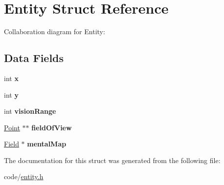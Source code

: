 \hypertarget{structEntity}{}\section{Entity Struct Reference}
\label{structEntity}


Collaboration diagram for Entity\+:
\subsection*{Data Fields}
\begin{DoxyCompactItemize}
\item 
int {\bfseries x}\hypertarget{structEntity_aae071f833fcdfdb6983c4a5aadc7829f}{}\label{structEntity_aae071f833fcdfdb6983c4a5aadc7829f}

\item 
int {\bfseries y}\hypertarget{structEntity_a3032094a99240e958512727451630e7b}{}\label{structEntity_a3032094a99240e958512727451630e7b}

\item 
int {\bfseries vision\+Range}\hypertarget{structEntity_a2d80399b18ead4ff944acd95bc978048}{}\label{structEntity_a2d80399b18ead4ff944acd95bc978048}

\item 
\hyperlink{structPoint}{Point} $\ast$$\ast$ {\bfseries field\+Of\+View}\hypertarget{structEntity_a0aee7c84c212b017cc1611463d8fd314}{}\label{structEntity_a0aee7c84c212b017cc1611463d8fd314}

\item 
\hyperlink{structField}{Field} $\ast$ {\bfseries mental\+Map}\hypertarget{structEntity_ab5af27cedb2cef14adf3489992203f56}{}\label{structEntity_ab5af27cedb2cef14adf3489992203f56}

\end{DoxyCompactItemize}


The documentation for this struct was generated from the following file\+:\begin{DoxyCompactItemize}
\item 
code/\hyperlink{entity_8h}{entity.\+h}\end{DoxyCompactItemize}
